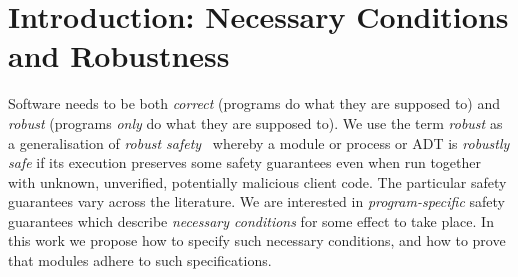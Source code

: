\section{Introduction: Necessary Conditions and Robustness}
\label{s:intro}




{Software needs} to be both {\emph{correct}} ({programs do what they
  are supposed to}) and {\emph{robust}} ({programs \emph{only} do what they are supposed to}). 
 {We use the term \emph{robust} as a generalisation of \emph{robust safety}~\cite{gordonJefferyRobustSafety, Bugliesi:resource-aware,ddd}  whereby a module or process or ADT is \emph{robustly safe} if its execution preserves some safety guarantees even when run together with unknown,   unverified, potentially malicious client code. 
 The particular safety guarantees vary across the literature. 
We are interested in \emph{program-specific} safety guarantees which describe  \emph{necessary conditions}
 for some effect to take place.
In this work we propose how to specify such necessary conditions, and how to prove that modules adhere to such specifications.}   
 
